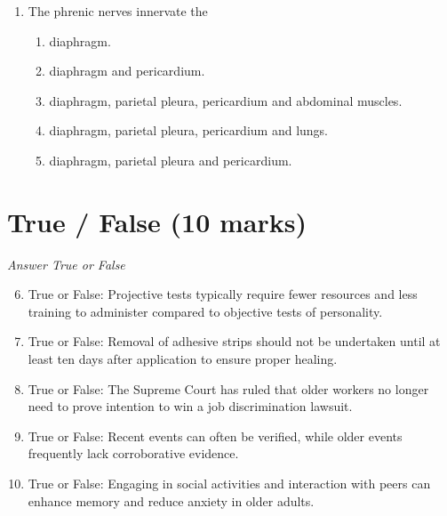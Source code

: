 \documentclass[12pt]{article}
\begin{document}
\begin{enumerate}[label=\arabic*.]
\begin{enumerate}[label=(\alph*)]
    \item motor and autonomic neuronal processes.
    \item both autonomic and motor neuronal processes.
    \item both sensory and motor neuronal processes.
    \item sensory and autonomic neuronal processes.
    \item motor neuronal processes.
\end{enumerate}
\item The phrenic nerves innervate the
\begin{enumerate}[label=(\alph*)]
    \item diaphragm.
    \item diaphragm and pericardium.
    \item diaphragm, parietal pleura, pericardium and abdominal muscles.
    \item diaphragm, parietal pleura, pericardium and lungs.
    \item diaphragm, parietal pleura and pericardium.
\end{enumerate}
\end{enumerate}

\section*{True / False (10 marks)}
\textit{Answer True or False}
\begin{enumerate}[label=\arabic*.]
\setcounter{enumi}{5}
\item True or False: Projective tests typically require fewer resources and less training to administer compared to objective tests of personality.
\item True or False: Removal of adhesive strips should not be undertaken until at least ten days after application to ensure proper healing.
\item True or False: The Supreme Court has ruled that older workers no longer need to prove intention to win a job discrimination lawsuit.
\item True or False: Recent events can often be verified, while older events frequently lack corroborative evidence.
\item True or False: Engaging in social activities and interaction with peers can enhance memory and reduce anxiety in older adults.
\end{enumerate}
\end{document}
